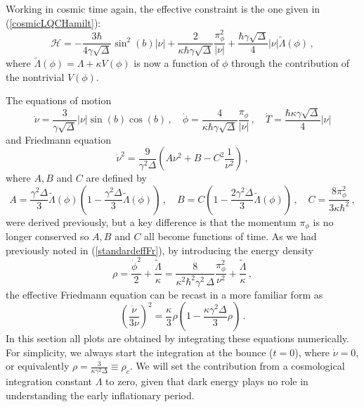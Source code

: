 \documentclass[aps,prd,11pt,showkeys,nofootinbib]{revtex4-2}
\begin{document}
Working in cosmic time again, the effective constraint is the one given in (\ref{cosmicLQCHamilt}): 
\begin{equation}
    \mathcal{H} = -\frac{3\hbar}{4\gamma\sqrt{\Delta}} \sin^2 (b) |\nu|+\frac{2}{\kappa \hbar \gamma\sqrt{\Delta}} \frac{\pi_\phi^2}{|\nu|}+\frac{\hbar\gamma\sqrt{\Delta}}{4} |\nu| \tilde\Lambda(\phi)\,,
\end{equation}
where $\tilde\Lambda(\phi)=\Lambda+\kappa V(\phi)$ is now a function of $\phi$ through the contribution of the nontrivial $V(\phi)$.

The equations of motion
\begin{equation}
\dot\nu = \frac{3}{\gamma\sqrt{\Delta}}|\nu|\sin(b) \cos(b)\,,\quad \dot\phi = \frac{4}{\kappa\hbar\gamma\sqrt{\Delta}}\frac{\pi_\phi}{|\nu|}\,, \quad\dot{T} = \frac{\hbar\kappa\gamma\sqrt{\Delta}}{4} |\nu| 
\end{equation}
and Friedmann equation
\begin{equation}
\dot{\nu}^2 = \frac{9}{\gamma^2\Delta}\left(A\nu^2+B-C^2 \frac{1}{\nu^2}\right)\,,
\end{equation}
where $A, B$ and $C$ are defined by
\begin{equation}
    A = \frac{\gamma^2\Delta}{3}\tilde{\Lambda}(\phi)\left(1-\frac{\gamma^2\Delta}{3}\tilde{\Lambda}(\phi)\right)\,,\quad B= C\left(1-\frac{2\gamma^2\Delta}{3}\tilde{\Lambda}(\phi)\right)\,,\quad C = \frac{8\pi_\phi^2}{3 \kappa \hbar^2}\,,
\end{equation}
were derived previously, but a key difference is that the momentum $\pi_\phi$ is no longer conserved so $A, B$ and $C$ all become functions of time. As we had previously noted in (\ref{standardeffFr}), by introducing the energy density
\begin{equation}
    \rho = \frac{\dot\phi^2}{2}+\frac{\tilde\Lambda}{\kappa} = \frac{8}{\kappa^2\hbar^2\gamma^2\,\Delta}\frac{\pi_\phi^2}{\nu^2}+\frac{\tilde\Lambda}{\kappa}\,,
\end{equation}
the effective Friedmann equation can be recast in a more familiar form as
\begin{equation}
    \left(\frac{\dot\nu}{3\nu}\right)^2 = \frac{\kappa}{3} \rho\left(1-\frac{\kappa\gamma^2\Delta}{3}\rho\right)\,.
\end{equation}
In this section all plots are obtained by integrating these equations numerically. For simplicity, we always start the integration at the bounce ($t=0$), where $\dot\nu=0$, or equivalently $\rho = \frac{3}{\kappa\gamma^2\Delta} \equiv \rho_c$. We will set the contribution from a cosmological integration constant $\Lambda$ to zero, given that dark energy plays no role in understanding the early inflationary period.
\end{document}
